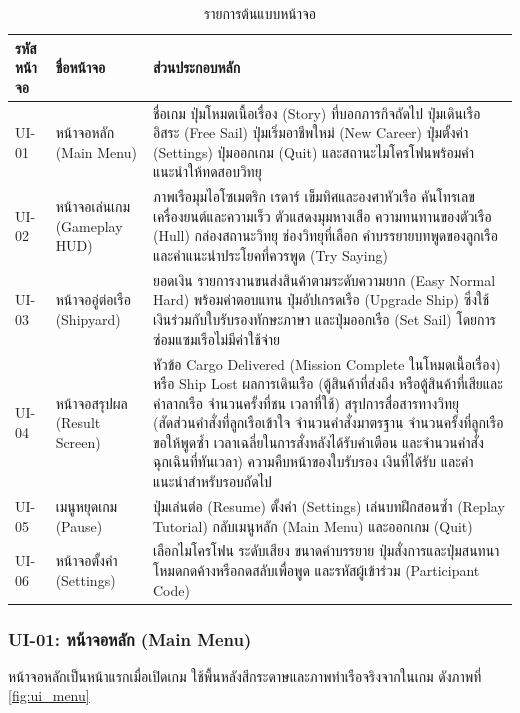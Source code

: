 \begin{table}[!htbp]
\centering
\caption{รายการต้นแบบหน้าจอ}
\label{tab:mockups}
\begin{tabular}{|L{1.48cm}|L{3.44cm}|L{8.36cm}|}
\hline
\textbf{รหัสหน้าจอ} & \textbf{ชื่อหน้าจอ} & \textbf{ส่วนประกอบหลัก} \\
\hline
UI-01 & หน้าจอหลัก (Main Menu) & ชื่อเกม ปุ่มโหมดเนื้อเรื่อง (Story) ที่บอกภารกิจถัดไป ปุ่มเดินเรืออิสระ (Free Sail) ปุ่มเริ่มอาชีพใหม่ (New Career) ปุ่มตั้งค่า (Settings) ปุ่มออกเกม (Quit) และสถานะไมโครโฟนพร้อมคำแนะนำให้ทดสอบวิทยุ \\ \hline
UI-02 & หน้าจอเล่นเกม (Gameplay HUD) & ภาพเรือมุมไอโซเมตริก เรดาร์ เข็มทิศและองศาหัวเรือ คันโทรเลขเครื่องยนต์และความเร็ว ตัวแสดงมุมหางเสือ ความทนทานของตัวเรือ (Hull) กล่องสถานะวิทยุ ช่องวิทยุที่เลือก คำบรรยายบทพูดของลูกเรือ และคำแนะนำประโยคที่ควรพูด (Try Saying) \\ \hline
UI-03 & หน้าจออู่ต่อเรือ (Shipyard) & ยอดเงิน รายการงานขนส่งสินค้าตามระดับความยาก (Easy Normal Hard) พร้อมค่าตอบแทน ปุ่มอัปเกรดเรือ (Upgrade Ship) ซึ่งใช้เงินร่วมกับใบรับรองทักษะภาษา และปุ่มออกเรือ (Set Sail) โดยการซ่อมแซมเรือไม่มีค่าใช้จ่าย \\ \hline
UI-04 & หน้าจอสรุปผล (Result Screen) & หัวข้อ Cargo Delivered (Mission Complete ในโหมดเนื้อเรื่อง) หรือ Ship Lost ผลการเดินเรือ (ตู้สินค้าที่ส่งถึง หรือตู้สินค้าที่เสียและค่าลากเรือ จำนวนครั้งที่ชน เวลาที่ใช้) สรุปการสื่อสารทางวิทยุ (สัดส่วนคำสั่งที่ลูกเรือเข้าใจ จำนวนคำสั่งมาตรฐาน จำนวนครั้งที่ลูกเรือขอให้พูดซ้ำ เวลาเฉลี่ยในการสั่งหลังได้รับคำเตือน และจำนวนคำสั่งฉุกเฉินที่ทันเวลา) ความคืบหน้าของใบรับรอง เงินที่ได้รับ และคำแนะนำสำหรับรอบถัดไป \\ \hline
UI-05 & เมนูหยุดเกม (Pause) & ปุ่มเล่นต่อ (Resume) ตั้งค่า (Settings) เล่นบทฝึกสอนซ้ำ (Replay Tutorial) กลับเมนูหลัก (Main Menu) และออกเกม (Quit) \\ \hline
UI-06 & หน้าจอตั้งค่า (Settings) & เลือกไมโครโฟน ระดับเสียง ขนาดคำบรรยาย ปุ่มสั่งการและปุ่มสนทนา โหมดกดค้างหรือกดสลับเพื่อพูด และรหัสผู้เข้าร่วม (Participant Code) \\
\hline
\end{tabular}
\end{table}

\subsubsection{UI-01: หน้าจอหลัก (Main Menu)}

หน้าจอหลักเป็นหน้าแรกเมื่อเปิดเกม ใช้พื้นหลังสีกระดาษและภาพท่าเรือจริงจากในเกม ดังภาพที่ \ref{fig:ui_menu}

